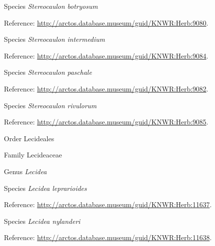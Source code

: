 \documentclass[9pt, article]{memoir}
\begin{document}
\begin{multicols}{2}
\vspace{6pt}\noindent\hspace{36pt}Species \textit{Stereocaulon botryosum}


\vspace{6pt}Reference: 
\url{http://arctos.database.museum/guid/KNWR:Herb:9080}.

\vspace{6pt}\noindent\hspace{36pt}Species \textit{Stereocaulon intermedium}


\vspace{6pt}Reference: 
\url{http://arctos.database.museum/guid/KNWR:Herb:9084}.

\vspace{6pt}\noindent\hspace{36pt}Species \textit{Stereocaulon paschale}


\vspace{6pt}Reference: 
\url{http://arctos.database.museum/guid/KNWR:Herb:9082}.

\vspace{6pt}\noindent\hspace{36pt}Species \textit{Stereocaulon rivulorum}


\vspace{6pt}Reference: 
\url{http://arctos.database.museum/guid/KNWR:Herb:9085}.

\vspace{6pt}\noindent\hspace{18pt}Order Lecideales


\vspace{6pt}\noindent\hspace{24pt}Family Lecideaceae


\vspace{6pt}\noindent\hspace{30pt}Genus \textit{Lecidea}


\vspace{6pt}\noindent\hspace{36pt}Species \textit{Lecidea leprarioides}


\vspace{6pt}Reference: 
\url{http://arctos.database.museum/guid/KNWR:Herb:11637}.

\vspace{6pt}\noindent\hspace{36pt}Species \textit{Lecidea nylanderi}


\vspace{6pt}Reference: 
\url{http://arctos.database.museum/guid/KNWR:Herb:11638}.


\end{multicols}
\end{document}
